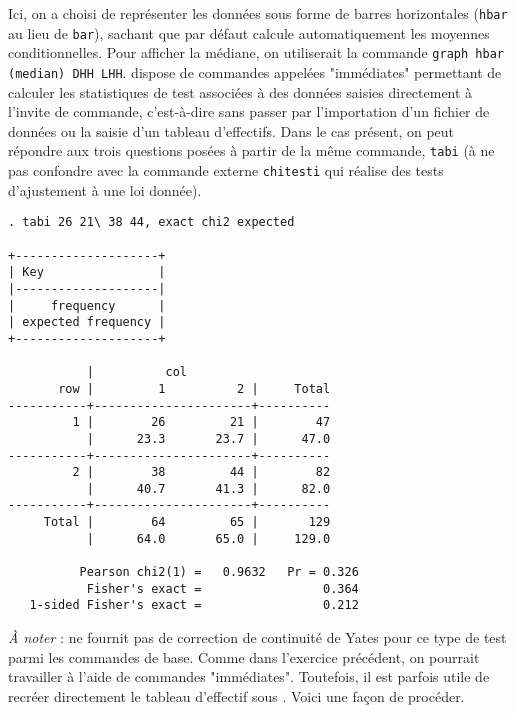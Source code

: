 Ici, on a choisi de représenter les données sous forme de barres
horizontales (\texttt{hbar} au lieu de \texttt{bar}), sachant que par défaut
\Stata calcule automatiquement les moyennes conditionnelles. Pour afficher la
médiane, on utiliserait la commande \verb|graph hbar (median) DHH LHH|.
% 
%
%
\soln{\ref{exo:9.3}} \Stata dispose de commandes appelées "immédiates"
permettant de calculer les statistiques de test associées à des données
saisies directement à l'invite de commande, c'est-à-dire sans passer par
l'importation d'un fichier de données ou la saisie d'un tableau
d'effectifs. Dans le cas présent, on peut répondre aux trois questions
posées à partir de la même commande, \texttt{tabi} (à ne pas confondre
avec la commande externe \texttt{chitesti} qui réalise des tests
d'ajustement à une loi donnée).  
\begin{verbatim}
. tabi 26 21\ 38 44, exact chi2 expected

+--------------------+
| Key                |
|--------------------|
|     frequency      |
| expected frequency |
+--------------------+

           |          col
       row |         1          2 |     Total
-----------+----------------------+----------
         1 |        26         21 |        47 
           |      23.3       23.7 |      47.0 
-----------+----------------------+----------
         2 |        38         44 |        82 
           |      40.7       41.3 |      82.0 
-----------+----------------------+----------
     Total |        64         65 |       129 
           |      64.0       65.0 |     129.0 

          Pearson chi2(1) =   0.9632   Pr = 0.326
           Fisher's exact =                 0.364
   1-sided Fisher's exact =                 0.212
\end{verbatim}
\emph{À noter} : \Stata ne fournit pas de correction de continuité de Yates pour ce
type de test parmi les commandes de base.  
%
%
%
\soln{\ref{exo:9.4}} Comme dans l'exercice précédent, on pourrait travailler
à l'aide de commandes "immédiates". Toutefois, il est parfois utile de
recréer directement le tableau d'effectif sous \Stata. Voici une façon de
procéder. \label{exo:3.5stata}

